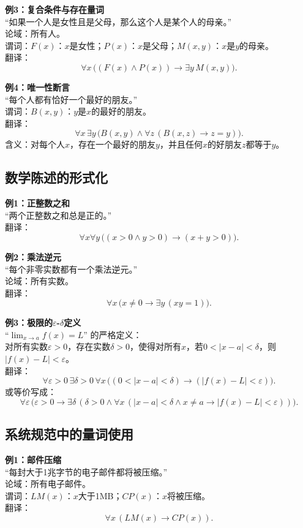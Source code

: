 \documentclass[UTF8,11pt,a4paper]{ctexbook}   %
\theoremstyle{definition}
\begin{document}
\textbf{例3：复合条件与存在量词}\\
“如果一个人是女性且是父母，那么这个人是某个人的母亲。”\\
论域：所有人。\\
谓词：$F(x)$：$x$是女性；$P(x)$：$x$是父母；$M(x,y)$：$x$是$y$的母亲。\\
翻译：
\[
\forall x\,\bigl((F(x)\land P(x))\to\exists y\,M(x,y)\bigr).
\]

\textbf{例4：唯一性断言}\\
“每个人都有恰好一个最好的朋友。”\\
谓词：$B(x,y)$：$y$是$x$的最好的朋友。\\
翻译：
\[
\forall x\,\exists y\,\bigl(B(x,y)\land\forall z\,(B(x,z)\to z=y)\bigr).
\]
含义：对每个人$x$，存在一个最好的朋友$y$，并且任何$x$的好朋友$z$都等于$y$。

\subsection{数学陈述的形式化}

\textbf{例1：正整数之和}\\
“两个正整数之和总是正的。”\\
翻译：
\[
\forall x\forall y\,\bigl((x>0\land y>0)\to(x+y>0)\bigr).
\]

\textbf{例2：乘法逆元}\\
“每个非零实数都有一个乘法逆元。”\\
论域：所有实数。\\
翻译：
\[
\forall x\,\bigl(x\neq 0\to\exists y\,(xy=1)\bigr).
\]

\textbf{例3：极限的$\varepsilon$-$\delta$定义}\\
“$\displaystyle\lim_{x\to a}f(x)=L$” 的严格定义：\\
对所有实数$\varepsilon>0$，存在实数$\delta>0$，使得对所有$x$，若$0<|x-a|<\delta$，则$|f(x)-L|<\varepsilon$。\\
翻译：
\[
\forall\varepsilon>0\,\exists\delta>0\,\forall x\,\bigl((0<|x-a|<\delta)\to(|f(x)-L|<\varepsilon)\bigr).
\]
或等价写成：
\[
\forall\varepsilon\,\bigl(\varepsilon>0\to\exists\delta\,(\delta>0\land\forall x\,(|x-a|<\delta\land x\neq a\to|f(x)-L|<\varepsilon))\bigr).
\]

\subsection{系统规范中的量词使用}

\textbf{例1：邮件压缩}\\
“每封大于1兆字节的电子邮件都将被压缩。”\\
论域：所有电子邮件。\\
谓词：$LM(x)$：$x$大于1MB；$CP(x)$：$x$将被压缩。\\
翻译：
\[
\forall x\,(LM(x)\to CP(x)).
\]
\end{document}
